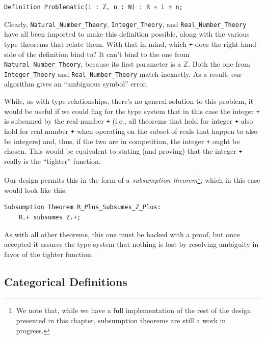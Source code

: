 \begin{lstlisting}
Definition Problematic(i : Z, n : N) : R = i + n;
\end{lstlisting}

Clearly, \texttt{Natural\_Number\_Theory}, \texttt{Integer\_Theory}, and \texttt{Real\_Number\_Theory} have all been imported to make this definition possible, along with the various type theorems that relate them.  With that in mind, which \texttt{+} does the right-hand-side of the definition bind to?  It can't bind to the one from \texttt{Natural\_Number\_Theory}, because its first parameter is a $\mathbb{Z}$.  Both the one from \texttt{Integer\_Theory} and \texttt{Real\_Number\_Theory} match inexactly.  As a result, our algorithm gives an ``ambiguous symbol'' error.

While, as with type relationships, there's no general solution to this problem, it would be useful if we could flag for the type system that in this case the integer \texttt{+} is subsumed by the real-number \texttt{+} (i.e., all theorems that hold for integer \texttt{+} also hold for real-number \texttt{+} when operating on the subset of reals that happen to also be integers) and, thus, if the two are in competition, the integer \texttt{+} ought be chosen.  This would be equivalent to stating (and proving) that the integer \texttt{+} really is the ``tighter'' function.

Our design permits this in the form of a \emph{subsumption theorem}\footnote{We note that, while we have a full implementation of the rest of the design presented in this chapter, subsumption theorems are still a work in progress.}, which in this case would look like this:

\begin{lstlisting}
Subsumption Theorem R_Plus_Subsumes_Z_Plus:
	R.+ subsumes Z.+;
\end{lstlisting}

As with all other theorems, this one must be backed with a proof, but once accepted it assures the type-system that nothing is lost by resolving ambiguity in favor of the tighter function.


	\subsection{Categorical Definitions\label{sec:categoricalDefinitions}}

